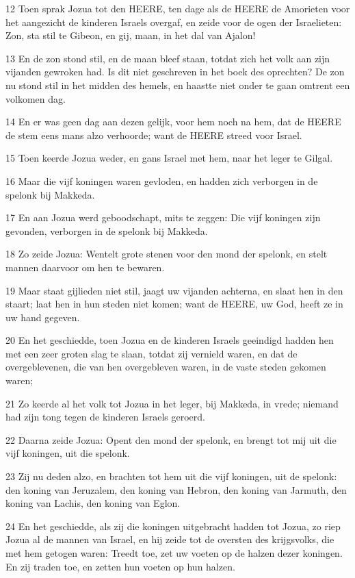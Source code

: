\par 12 Toen sprak Jozua tot den HEERE, ten dage als de HEERE de Amorieten voor het aangezicht de kinderen Israels overgaf, en zeide voor de ogen der Israelieten: Zon, sta stil te Gibeon, en gij, maan, in het dal van Ajalon!
\par 13 En de zon stond stil, en de maan bleef staan, totdat zich het volk aan zijn vijanden gewroken had. Is dit niet geschreven in het boek des oprechten? De zon nu stond stil in het midden des hemels, en haastte niet onder te gaan omtrent een volkomen dag.
\par 14 En er was geen dag aan dezen gelijk, voor hem noch na hem, dat de HEERE de stem eens mans alzo verhoorde; want de HEERE streed voor Israel.
\par 15 Toen keerde Jozua weder, en gans Israel met hem, naar het leger te Gilgal.
\par 16 Maar die vijf koningen waren gevloden, en hadden zich verborgen in de spelonk bij Makkeda.
\par 17 En aan Jozua werd geboodschapt, mits te zeggen: Die vijf koningen zijn gevonden, verborgen in de spelonk bij Makkeda.
\par 18 Zo zeide Jozua: Wentelt grote stenen voor den mond der spelonk, en stelt mannen daarvoor om hen te bewaren.
\par 19 Maar staat gijlieden niet stil, jaagt uw vijanden achterna, en slaat hen in den staart; laat hen in hun steden niet komen; want de HEERE, uw God, heeft ze in uw hand gegeven.
\par 20 En het geschiedde, toen Jozua en de kinderen Israels geeindigd hadden hen met een zeer groten slag te slaan, totdat zij vernield waren, en dat de overgeblevenen, die van hen overgebleven waren, in de vaste steden gekomen waren;
\par 21 Zo keerde al het volk tot Jozua in het leger, bij Makkeda, in vrede; niemand had zijn tong tegen de kinderen Israels geroerd.
\par 22 Daarna zeide Jozua: Opent den mond der spelonk, en brengt tot mij uit die vijf koningen, uit die spelonk.
\par 23 Zij nu deden alzo, en brachten tot hem uit die vijf koningen, uit de spelonk: den koning van Jeruzalem, den koning van Hebron, den koning van Jarmuth, den koning van Lachis, den koning van Eglon.
\par 24 En het geschiedde, als zij die koningen uitgebracht hadden tot Jozua, zo riep Jozua al de mannen van Israel, en hij zeide tot de oversten des krijgsvolks, die met hem getogen waren: Treedt toe, zet uw voeten op de halzen dezer koningen. En zij traden toe, en zetten hun voeten op hun halzen.
